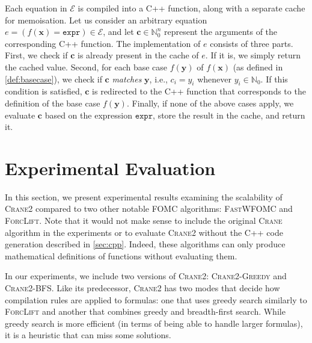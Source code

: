 \documentclass[letterpaper]{article} %
\theoremstyle{remark}
\theoremstyle{definition}
\newcommand{\expr}{\mathtt{expr}}
\newcommand{\Cranetwo}{\textsc{Crane2}}
\newcommand{\Cranebfs}{\textsc{Crane2-BFS}}
\newcommand{\Cranegreedy}{\textsc{Crane2-Greedy}}
\begin{document}
Each equation in $\mathcal{E}$ is compiled into a C++ function, along with a
separate cache for memoisation. Let us consider an arbitrary equation
$e = (f(\mathbf{x}) = \expr{}) \in \mathcal{E}$, and let
$\mathbf{c} \in \mathbb{N}_{0}^{n}$ represent the arguments of the corresponding
C++ function. The implementation of $e$ consists of three parts. First, we check
if $\mathbf{c}$ is already present in the cache of $e$. If it is, we simply
return the cached value. Second, for each base case $f(\mathbf{y})$ of
$f(\mathbf{x})$ (as defined in \cref{def:basecase}), we check if $\mathbf{c}$
\emph{matches} $\mathbf{y}$, i.e., $c_{i} = y_{i}$ whenever
$y_{i} \in \mathbb{N}_{0}$. If this condition is satisfied, $\mathbf{c}$ is
redirected to the C++ function that corresponds to the definition of the base
case $f(\mathbf{y})$. Finally, if none of the above cases apply, we evaluate
$\mathbf{c}$ based on the expression $\expr{}$, store the result in the cache,
and return it.

\section{Experimental Evaluation}\label{sec:experiments}




In this section, we present experimental results examining the scalability of
\Cranetwo{} compared to two other notable FOMC algorithms: \textsc{FastWFOMC}
and \textsc{ForcLift}. Note that it would not make sense to include the original
\textsc{Crane} algorithm in the experiments or to evaluate \Cranetwo{} without
the C++ code generation described in \cref{sec:cpp}. Indeed, these algorithms
can only produce mathematical definitions of functions without evaluating them.

In our experiments, we include two versions of \Cranetwo{}: \Cranegreedy{} and
\Cranebfs{}. Like its predecessor, \Cranetwo{} has two modes that decide how
compilation rules are applied to formulas: one that uses greedy search similarly
to \textsc{ForcLift} and another that combines greedy and breadth-first search.
While greedy search is more efficient (in terms of being able to handle larger
formulas), it is a heuristic that can miss some solutions.
\end{document}
